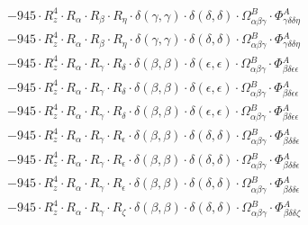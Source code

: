 \documentclass{article}
\begin{document}
\begin{subequations}
\begin{gather}
\begin{array}{c}
 \\[0.2em] 		 - 945 \cdot R_{z}^{4} \cdot R_{\alpha{}} \cdot R_{\beta{}} \cdot R_{\eta{}} \cdot \delta{}\left(\gamma{}, \gamma{}\right) \cdot \delta{}\left(\delta{}, \delta{}\right) \cdot \Omega{}^{B}_{\alpha{}\beta{}\gamma{}} \cdot \Phi{}^{A}_{\gamma{}\delta{}\delta{}\eta{}} 
 \\[0.2em] 		 - 945 \cdot R_{z}^{4} \cdot R_{\alpha{}} \cdot R_{\beta{}} \cdot R_{\eta{}} \cdot \delta{}\left(\gamma{}, \gamma{}\right) \cdot \delta{}\left(\delta{}, \delta{}\right) \cdot \Omega{}^{B}_{\alpha{}\beta{}\gamma{}} \cdot \Phi{}^{A}_{\gamma{}\delta{}\delta{}\eta{}} 
 \\[0.2em] 		 - 945 \cdot R_{z}^{4} \cdot R_{\alpha{}} \cdot R_{\gamma{}} \cdot R_{\delta{}} \cdot \delta{}\left(\beta{}, \beta{}\right) \cdot \delta{}\left(\epsilon{}, \epsilon{}\right) \cdot \Omega{}^{B}_{\alpha{}\beta{}\gamma{}} \cdot \Phi{}^{A}_{\beta{}\delta{}\epsilon{}\epsilon{}} 
 \\[0.2em] 		 - 945 \cdot R_{z}^{4} \cdot R_{\alpha{}} \cdot R_{\gamma{}} \cdot R_{\delta{}} \cdot \delta{}\left(\beta{}, \beta{}\right) \cdot \delta{}\left(\epsilon{}, \epsilon{}\right) \cdot \Omega{}^{B}_{\alpha{}\beta{}\gamma{}} \cdot \Phi{}^{A}_{\beta{}\delta{}\epsilon{}\epsilon{}} 
 \\[0.2em] 		 - 945 \cdot R_{z}^{4} \cdot R_{\alpha{}} \cdot R_{\gamma{}} \cdot R_{\delta{}} \cdot \delta{}\left(\beta{}, \beta{}\right) \cdot \delta{}\left(\epsilon{}, \epsilon{}\right) \cdot \Omega{}^{B}_{\alpha{}\beta{}\gamma{}} \cdot \Phi{}^{A}_{\beta{}\delta{}\epsilon{}\epsilon{}} 
 \\[0.2em] 		 - 945 \cdot R_{z}^{4} \cdot R_{\alpha{}} \cdot R_{\gamma{}} \cdot R_{\epsilon{}} \cdot \delta{}\left(\beta{}, \beta{}\right) \cdot \delta{}\left(\delta{}, \delta{}\right) \cdot \Omega{}^{B}_{\alpha{}\beta{}\gamma{}} \cdot \Phi{}^{A}_{\beta{}\delta{}\delta{}\epsilon{}} 
 \\[0.2em] 		 - 945 \cdot R_{z}^{4} \cdot R_{\alpha{}} \cdot R_{\gamma{}} \cdot R_{\epsilon{}} \cdot \delta{}\left(\beta{}, \beta{}\right) \cdot \delta{}\left(\delta{}, \delta{}\right) \cdot \Omega{}^{B}_{\alpha{}\beta{}\gamma{}} \cdot \Phi{}^{A}_{\beta{}\delta{}\delta{}\epsilon{}} 
 \\[0.2em] 		 - 945 \cdot R_{z}^{4} \cdot R_{\alpha{}} \cdot R_{\gamma{}} \cdot R_{\epsilon{}} \cdot \delta{}\left(\beta{}, \beta{}\right) \cdot \delta{}\left(\delta{}, \delta{}\right) \cdot \Omega{}^{B}_{\alpha{}\beta{}\gamma{}} \cdot \Phi{}^{A}_{\beta{}\delta{}\delta{}\epsilon{}} 
 \\[0.2em] 		 - 945 \cdot R_{z}^{4} \cdot R_{\alpha{}} \cdot R_{\gamma{}} \cdot R_{\zeta{}} \cdot \delta{}\left(\beta{}, \beta{}\right) \cdot \delta{}\left(\delta{}, \delta{}\right) \cdot \Omega{}^{B}_{\alpha{}\beta{}\gamma{}} \cdot \Phi{}^{A}_{\beta{}\delta{}\delta{}\zeta{}} 

\end{array}
\end{gather}
\end{subequations}
\end{document}

